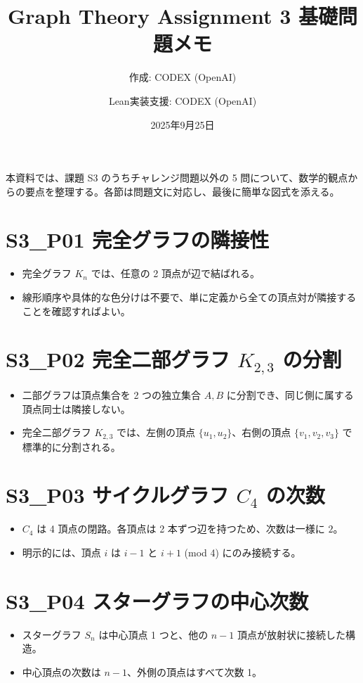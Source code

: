 \documentclass[uplatex]{article}
\title{Graph Theory Assignment 3 基礎問題メモ}
\author{作成: CODEX (OpenAI) \and Lean実装支援: CODEX (OpenAI)}
\date{2025年9月25日}
\begin{document}
\maketitle

本資料では、課題 S3 のうちチャレンジ問題以外の 5 問について、数学的観点からの要点を整理する。各節は問題文に対応し、最後に簡単な図式を添える。

\section{S3\_P01 完全グラフの隣接性}
\begin{itemize}
  \item 完全グラフ $K_n$ では、任意の 2 頂点が辺で結ばれる。\newline
  \item 線形順序や具体的な色分けは不要で、単に定義から全ての頂点対が隣接することを確認すればよい。
\end{itemize}

\section{S3\_P02 完全二部グラフ $K_{2,3}$ の分割}
\begin{itemize}
  \item 二部グラフは頂点集合を 2 つの独立集合 $A,B$ に分割でき、同じ側に属する頂点同士は隣接しない。
  \item 完全二部グラフ $K_{2,3}$ では、左側の頂点 $\{u_1,u_2\}$、右側の頂点 $\{v_1,v_2,v_3\}$ で標準的に分割される。
\end{itemize}

\section{S3\_P03 サイクルグラフ $C_4$ の次数}
\begin{itemize}
  \item $C_4$ は 4 頂点の閉路。各頂点は 2 本ずつ辺を持つため、次数は一様に $2$。
  \item 明示的には、頂点 $i$ は $i-1$ と $i+1$ (mod 4) にのみ接続する。
\end{itemize}

\section{S3\_P04 スターグラフの中心次数}
\begin{itemize}
  \item スターグラフ $S_n$ は中心頂点 1 つと、他の $n-1$ 頂点が放射状に接続した構造。
  \item 中心頂点の次数は $n-1$、外側の頂点はすべて次数 1。
\end{itemize}
\end{document}
